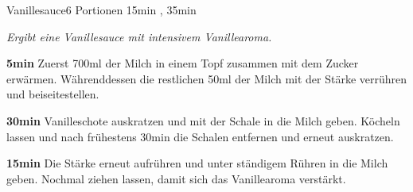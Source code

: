 \documentclass[../recipe-collections/cooking.tex]{subfiles}
\begin{document}
\begin{recipe}{Vanillesauce}{6 Portionen }{15min , 35min }

  \freeform{}\textit{Ergibt eine Vanillesauce mit intensivem Vanillearoma.}


  \textbf{5min}
  Zuerst 700ml der Milch in einem Topf zusammen mit dem Zucker erwärmen.
  Währenddessen die restlichen 50ml der Milch mit der Stärke verrühren und beiseitestellen.


  \textbf{30min}
  Vanilleschote auskratzen und mit der Schale in die Milch geben.
  Köcheln lassen und nach frühestens 30min die Schalen entfernen und erneut auskratzen.

  \newstep{}\textbf{15min}
  Die Stärke erneut aufrühren und unter ständigem Rühren in die Milch geben.
  Nochmal ziehen lassen, damit sich das Vanillearoma verstärkt.

  \freeform{}\hrulefill{}

\end{recipe}
\end{document}
